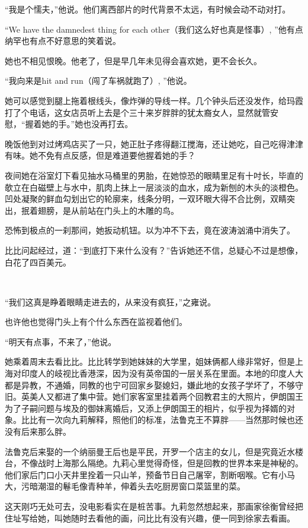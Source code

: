 \par “我是个懦夫，”他说。他们离西部片的时代背景不太远，有时候会动不动对打。
\par “We have the damnedest thing for each other（我们这么好也真是怪事）, ”他有点纳罕也有点不好意思的笑着说。
\par 她也不相见恨晚。他老了，但是早几年未见得会喜欢她，更不会长久。
\par “我向来是hit and run（闯了车祸就跑了）, ”他说。
\par 她可以感觉到腿上拖着根线头，像炸弹的导线一样。几个钟头后还没发作，给玛霞打了个电话，这女店员听上去是个三十来岁胖胖的犹太裔女人，显然就管安慰，“握着她的手。”她也没再打去。
\par 晚饭他到对过烤鸡店买了一只，她正肚子疼得翻江搅海，还让她吃，自己吃得津津有味。她不免有点反感，但是难道要他握着她的手？
\par 夜间她在浴室灯下看见抽水马桶里的男胎，在她惊恐的眼睛里足有十吋长，毕直的欹立在白磁壁上与水中，肌肉上抹上一层淡淡的血水，成为新刨的木头的淡橙色。凹处凝聚的鲜血勾划出它的轮廓来，线条分明，一双环眼大得不合比例，双睛突出，抿着翅膀，是从前站在门头上的木雕的鸟。
\par 恐怖到极点的一刹那间，她扳动机钮。以为冲不下去，竟在波涛汹涌中消失了。
\par 比比问起经过，道：“到底打下来什么没有？”告诉她还不信，总疑心不过是想像，白花了四百美元。
\par  
\par “我们这真是睁着眼睛走进去的，从来没有疯狂，”之雍说。
\par 也许他也觉得门头上有个什么东西在监视着他们。
\par “明天有点事，不来了，”他说。
\par 她乘着周末去看比比。比比转学到她妹妹的大学里，姐妹俩都人缘非常好，但是上海对印度人的岐视比香港深，因为没有英帝国的一层关系在里面。本地的印度人大都是异教，不通婚，同教的也宁可回家乡娶媳妇，嫌此地的女孩子学坏了，不够守旧。英美人又都进了集中营。她们家客室里挂着两个回教君主的大照片，伊朗国王为了子嗣问题与埃及的御妹离婚后，又添上伊朗国王的相片，似乎视为择婿的对象。比比有一次向九莉解释，照他们的标准，法鲁克王不算胖——当然那时候也还没有后来那么胖。
\par 法鲁克后来娶的一个纳丽曼王后也是平民，开罗一个店主的女儿，但是究竟近水楼台，不像战时上海那么隔绝。九莉心里觉得奇怪，但是回教的世界本来是神秘的。他们家后门口小天井里拴着一只山羊，预备节日自己屠宰，割断咽喉。它有小马大，污暗潮湿的鬈毛像青种羊，伸着头去吃厨房窗口菜篮里的菜。
\par 这天刚巧无处可去，没电影看实在是桩苦事。九莉忽然想起来，那画家徐衡曾经把住址写给她，叫她随时去看他的画，问比比有没有兴趣，便一同到徐家去看画。
